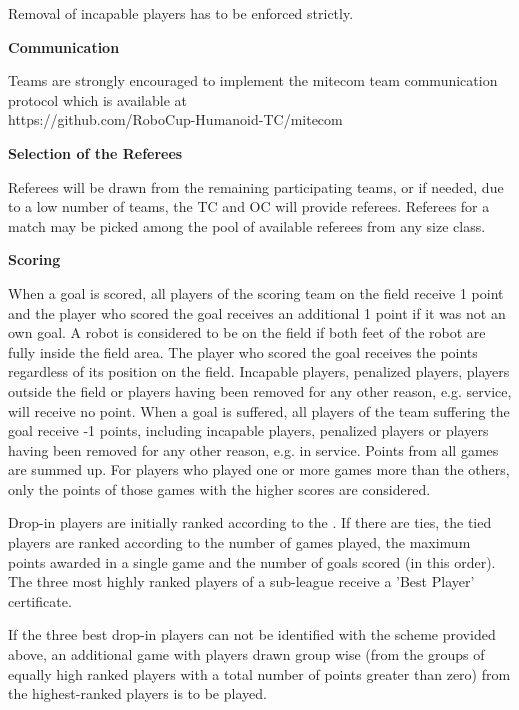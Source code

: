 Removal of incapable players has to be enforced strictly.

\bigskip
 
{\bfseries Communication}

Teams are strongly encouraged to implement the mitecom team communication protocol which is available at \\
\textcolor[rgb]{0.0,0.0,0.49803922}{https://github.com/RoboCup-Humanoid-TC/mitecom}

\bigskip
 
{\bfseries Selection of the Referees}

Referees will be drawn from the remaining participating teams, or if needed,
due to a low number of teams, the TC and OC will provide referees.
Referees for a match may be picked among the pool of available referees from any size class.

\bigskip
 
{\bfseries Scoring}

When a goal is scored, all players of the scoring team on the field receive 1 point and the player who scored the goal receives an additional 1 point if it was not an own goal. A robot is considered to be on the field if both feet of the robot are fully inside the field area. The player who scored the goal receives the points regardless of its position on the field. Incapable players, penalized players, players outside the field or players having been removed for any other reason, e.g. service, will receive no point. When a goal is suffered, all players of the team suffering the goal receive -1 points, including incapable players, penalized players or players having been removed for any other reason, e.g. in service. Points from all games are summed up. For players who played one or more games more than the others, only the points of those games with the higher scores are considered.

Drop-in players are initially ranked according to the 
.
If there are ties, the tied players are ranked according to
 the number of games played,
the maximum points awarded in a single game and the number of goals scored (in
this order).
The three most highly ranked players of a sub-league receive a 'Best Player' certificate.

If the three best drop-in players can not be identified with the scheme provided above, an additional game with players drawn group wise (from the groups of equally high ranked players with a total number of points greater than zero) from the highest-ranked players is to be played.

